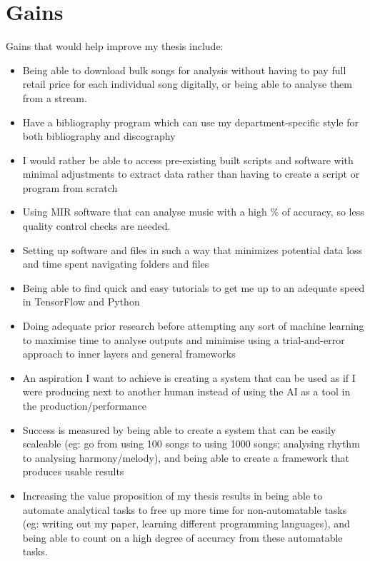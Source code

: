 \documentclass{article}
\begin{document}
\section{Gains}
Gains that would help improve my thesis include:
\begin{itemize}
    \item Being able to download bulk songs for analysis without having to pay full retail price for each individual song digitally, or being able to analyse them from a stream.
    \item Have a bibliography program which can use my department-specific style for both bibliography and discography
    \item I would rather be able to access pre-existing built scripts and software with minimal adjustments to extract data rather than having to create a script or program from scratch
    \item Using MIR software that can analyse music with a high \% of accuracy, so less quality control checks are needed.
    \item Setting up software and files in such a way that minimizes potential data loss and time spent navigating folders and files
    \item Being able to find quick and easy tutorials to get me up to an adequate speed in TensorFlow and Python
    \item Doing adequate prior research before attempting any sort of machine learning to maximise time to analyse outputs and minimise using a trial-and-error approach to inner layers and general frameworks
    \item An aspiration I want to achieve is creating a system that can be used as if I were producing next to another human instead of using the AI as a tool in the production/performance
    \item Success is measured by being able to create a system that can be easily scaleable (eg: go from using 100 songs to using 1000 songs; analysing rhythm to analysing harmony/melody), and being able to create a framework that produces usable results
    \item Increasing the value proposition of my thesis results in being able to automate analytical tasks to free up more time for non-automatable tasks (eg: writing out my paper, learning different programming languages), and being able to count on a high degree of accuracy from these automatable tasks.
\end{itemize}
\end{document}
